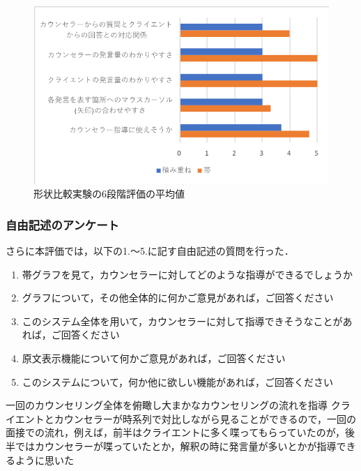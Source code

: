 \documentclass[shuuron]{kuee}
\begin{document}
\begin{figure}
  \begin{center}
    \includegraphics[width=\linewidth]{keijouAnketo.png}
  \end{center}
  \caption{形状比較実験の6段階評価の平均値}
  \label{fig:keijouAnketo}
\end{figure}


\subsubsection{自由記述のアンケート}

さらに本評価では，以下の1.〜5.に記す自由記述の質問を行った．

\begin{enumerate}
  \item 帯グラフを見て，カウンセラーに対してどのような指導ができるでしょうか
  \item グラフについて，その他全体的に何かご意見があれば，ご回答ください
  \item このシステム全体を用いて，カウンセラーに対して指導できそうなことがあれば，ご回答ください
  \item 原文表示機能について何かご意見があれば，ご回答ください
  \item このシステムについて，何か他に欲しい機能があれば，ご回答ください
\end{enumerate}

一回のカウンセリング全体を俯瞰し大まかなカウンセリングの流れを指導
クライエントとカウンセラーが時系列で対比しながら見ることができるので，一回の面接での流れ，例えば，前半はクライエントに多く喋ってもらっていたのが，後半ではカウンセラーが喋っていたとか，解釈の時に発言量が多いとかが指導できるように思いた
\end{document}
